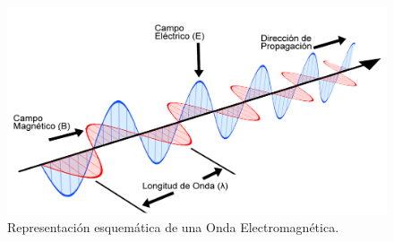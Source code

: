 \\
\begin{figure}[h]
    \centering
       \includegraphics[width=15cm]{archivos/oem}
        \caption{Representación esquemática de una Onda Electromagnética. \cite{Toppr2017}}
        \label{fig:oem}
\end{figure}

